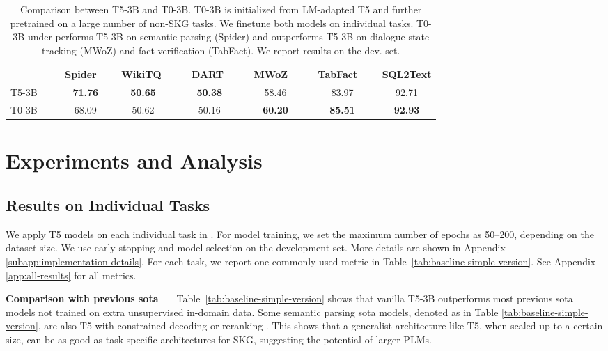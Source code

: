 \documentclass[11pt]{article}
\newcommand{\skg}{SKG\xspace}
\begin{document}
\begin{table}[t]
\begin{adjustbox}{width=0.98\linewidth}
		\begin{tabular}{@{}l@{}c@{}c@{}c@{}c@{}c@{}c@{}}
			\toprule
			& Spider \ & \ WikiTQ \ & \ \ DART \ \ &  \ MWoZ \ \ &  \ TabFact \ \ & SQL2Text \\ 
			\midrule 
		    T5-3B \ \ \ & \bf 71.76 & \bf 50.65 & \bf 50.38 & 58.46 & 83.97 & 92.71 \\
            T0-3B & 68.09 & 50.62 & 50.16 & \bf 60.20 & \bf 85.51 & \bf 92.93 \\
			\bottomrule
		\end{tabular}
	\end{adjustbox}
	\caption{Comparison between T5-3B and T0-3B. T0-3B is initialized from LM-adapted T5 and further pretrained on a large number of non-\skg tasks. We finetune both models on individual tasks.
	T0-3B under-performs T5-3B on semantic parsing (Spider) and outperforms T5-3B on dialogue state tracking (MWoZ) and fact verification (TabFact). We report results on the dev. set. }
	\vspace{-3mm}
	\label{tab:t0}
\end{table} 

\section{Experiments and Analysis}
\label{sec:results}

\subsection{Results on Individual Tasks} 
\label{subsec:baseline-performance}
We apply T5 models \cite{2020t5} on each individual task in \uskg.
For model training, we set the maximum number of epochs as 50--200, depending on the dataset size. We use early stopping and model selection on the development set. 
More details are shown in Appendix \ref{subapp:implementation-details}. 
For each task, we report one commonly used metric in Table~\ref{tab:baseline-simple-version}. See Appendix \ref{app:all-results} for all metrics. 

\noindent\textbf{Comparison with previous sota \ \ }
Table~\ref{tab:baseline-simple-version} shows that vanilla T5-3B outperforms most previous sota models not trained on extra unsupervised in-domain data.  
Some semantic parsing sota models, denoted as  in Table \ref{tab:baseline-simple-version}, are also T5 with constrained decoding \cite{Scholak2021:PICARD} or reranking \cite{ye2021rng}. 
This shows that a generalist architecture like T5, when scaled up to a certain size, can be as good as task-specific architectures for \skg, suggesting the potential of larger PLMs. 
\end{document}
